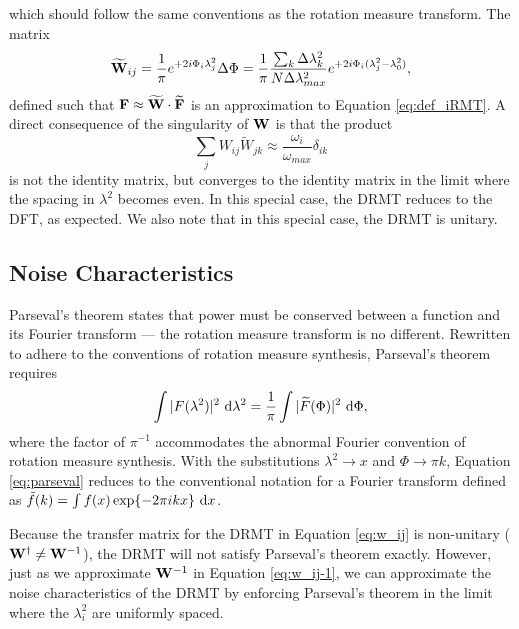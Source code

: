 which should follow the same conventions as the rotation measure transform. The matrix
\begin{equation}
  \widetilde{\mathbf{W}}_{ij} = \frac{1}{\pi}e^{+2i\Phi_i\lambda_j^2}\Delta\Phi
  = 
  \frac{1}{\pi}\frac{\sum_k\Delta\lambda_k^2}{N\Delta\lambda^2_{max}}e^{+2i\Phi_i(\lambda_j^2-\lambda_0^2)},
  \label{eq:w_ij-1}
\end{equation}
defined such that $\mathbf{F} \approx \widetilde{\mathbf{W}}\cdot\widetilde{\mathbf{F}}$ is an approximation to
Equation \ref{eq:def_iRMT}. A direct consequence of the singularity of $\mathbf{W}$ is that the product 
\begin{equation}
  \sum_j W_{ij}\widetilde{W}_{jk} \approx \frac{\omega_i}{\omega_{max}}\delta_{ik}
\end{equation}
is not the identity matrix, but converges to the identity matrix in the limit where the spacing in $\lambda^2$
becomes even. In this special case, the DRMT reduces to the DFT, as expected. We also note that in
this special case, the DRMT is unitary.

\subsection{Noise Characteristics}

Parseval's theorem states that power must be conserved between a function and its Fourier transform
--- the rotation measure transform is no different. Rewritten to adhere to the conventions of
rotation measure synthesis, Parseval's theorem requires 
\begin{equation}
  \int|F(\lambda^2)|^2\ \mathrm{d}\lambda^2 = \frac{1}{\pi}\int|\widetilde{F}(\Phi)|^2\ \mathrm{d}\Phi,
  \label{eq:parseval}
\end{equation}
where the factor of $\pi^{-1}$ accommodates the abnormal Fourier convention of rotation measure
synthesis. With the substitutions $\lambda^2\to x$ and $\Phi\to\pi k$, Equation \ref{eq:parseval}
reduces to the conventional notation for a Fourier transform defined as $\tilde{f}(k) = \int
f(x)\exp\{-2\pi ikx\}\ \mathrm{d}x$.

Because the transfer matrix for the DRMT in Equation \ref{eq:w_ij} is non-unitary ($\mathbf{W}^\dagger
\ne \mathbf{W}^{-1}$), the DRMT will not satisfy Parseval's theorem exactly. However, just as we
approximate $\mathbf{W}^{-1}$ in Equation \ref{eq:w_ij-1}, we can approximate the noise characteristics
of the DRMT by enforcing Parseval's theorem in the limit where the $\lambda_i^2$ are uniformly
spaced.

